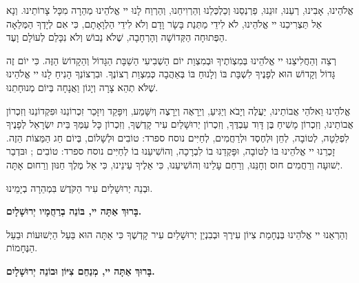 אֱלֹהֵינוּ, אָבִינוּ, רְעֵנוּ, זוּנֵנוּ, פַרְנְסֵנוּ וְכַלְכְּלֵנוּ וְהַרְוִיחֵנוּ, וְהַרְוַח לָנוּ יי אֱלֹהֵינוּ מְהֵרָה מִכָּל צָרוֹתֵינוּ. וְנָא אַל תַּצְרִיכֵנוּ יי אֱלֹהֵינוּ, לֹא לִידֵי מַתְּנַת בָּשָׂר וָדָם וְלֹא לִידֵי הַלְוָאָתָם, כִּי אִם לְיָדְךָ הַמְּלֵאָה הַפְּתוּחָה הַקְּדוֹשָׁה וְהָרְחָבָה, שֶׁלֹא נֵבוֹשׁ וְלֹא נִכָּלֵם לְעוֹלָם וָעֶד.

\begin{framed}

רְצֵה וְהַחֲלִיצֵנוּ יי אֱלֹהֵינוּ בְּמִצְוֹתֶיךָ וּבְמִצְוַת יוֹם הַשְׁבִיעִי הַשַׁבָּת הַגָּדוֹל וְהַקָדוֹשׂ הַזֶּה. כִּי יוֹם זֶה גָּדוֹל וְקָדוֹשׁ הוּא לְפָנֶיךָ לִשְׁבָּת בּוֹ וְלָנוּחַ בּוֹ בְּאַהֲבָה כְּמִצְוַת רְצוֹנֶךָ. וּבִרְצוֹנְךָ הָנִיחַ לָנוּ יי אֱלֹהֵינוּ שֶׁלֹּא תְהֵא צָרָה וְיָגוֹן וַאֲנָחָה בְּיוֹם מְנוּחָתֵנוּ.
\end{framed}

\vspace{1em}

אֱלֹהֵינוּ וֵאלֹהֵי אֲבוֹתֵינוּ, יַעֲלֶה וְיָבֹא וְיַגִּיעַ, וְיֵרָאֶה וְיֵרָצֶה וְיִשָּׁמַע, וְיִפָּקֵד וְיִזָּכֵר זִכְרוֹנֵנוּ וּפִקְדוֹנֵנוּ וְזִכְרוֹן אֲבוֹתֵינוּ, וְזִכְרוֹן מָשִׁיחַ בֶּן דָּוִד עַבְדֶּךָ, וְזִכְרוֹן יְרוּשָׁלַיִם עִיר קָדְשֶׁךָ, וְזִכְרוֹן כָּל עַמְּךָ בֵּית יִשְׂרָאֵל לְפָנֶיךָ לִפְלֵטָה, לְטוֹבָה, לְחֵן וּלְחֶסֶד וּלְרַחֲמִים, לְחַיִּים נוסח ספרד: טוֹבִים וּלְשָׁלוֹם, בְּיוֹם חַג הַמַּצּוֹת הַזֶה. זָכְרֵנוּ יי אֱלֹהֵינוּ בּוֹ לְטוֹבָה, וּפָּקְדֵנוּ בוֹ לִבְרָכָה, וְהוֹשִׁיעֵנוּ בוֹ לְחַיִּים נוסח ספרד: טוֹבִים ; וּבּדְבַר יְשׁוּעָה וְרַחֲמִים חוּס וְחָנֵּנוּ, וְרַחֵם עָלֵינוּ וְהוֹשִׁיעֵנוּ, כִּי אֵלֶיךָ עֵינֵינוּ, כִּי אֵל מֶלֶךְ חַנּוּן וְרַחוּם אָתָּה.

\vspace{1em}

\begin{minipage}{0.30\linewidth}
\hfill\textenglish{}
וּבְנֵה יְרוּשָׁלַיִם עִיר הַקֹּדֶשׁ בִּמְהֵרָה בְיָמֵינוּ. 
\begin{center}
{\large \bfseries
בָּרוּךְ אַתָּה יי, בּוֹנֵה בְרַחֲמָיו יְרוּשָׁלָיִם.
}\end{center}
\end{minipage}\hspace{0.01\linewidth}\vrule{}\hspace{0.01\linewidth}
\begin{minipage}{0.66\linewidth}
\hfill\textenglish{}

וְהַרְאֵנוּ יי אֱלֹהֵינוּ בְּנֶחָמַת צִיוֹן עִירֶךָ וּבְבִנְיַן יְרוּשָׁלַיִם עִיר קָדְשֶׁךָ כִּי אַתָּה הוּא בַּעַל הַיְשׁוּעוֹת וּבַעַל הַנֶּחָמוֹת. 

\begin{center}
{\large \bfseries
בָּרוּךְ אַתָּה יי, מְנַחֵם צִיּוֹן וּבוֹנֵה יְרוּשָׁלָיִם.
}\end{center}
\end{minipage}

